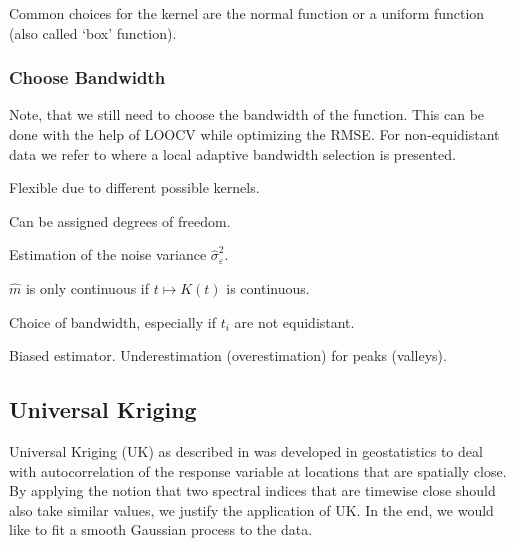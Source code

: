 		Common choices for the kernel are the normal function or a uniform function (also called `box' function). 
		\subsubsection*{Choose Bandwidth}
		Note, that we still need to choose the bandwidth of the function. This can be done with the help of LOOCV while optimizing the RMSE. For non-equidistant data we refer to \cite{brockmannLocallyAdaptiveBandwidth1993} where a local adaptive bandwidth selection is presented.

		\begin{my_pros_cons_table}{
				\item Flexible due to different possible kernels.
				\item Can be assigned degrees of freedom.
				\item Estimation of the noise variance $\hat \sigma_\varepsilon^2$.\footnotemark
			}{
				\item $\hat m $ is only continuous if $t \mapsto K(t)$ is continuous.
				\item Choice of bandwidth, especially if $t_i$ are not equidistant.
				\item Biased estimator. Underestimation (overestimation) for peaks (valleys).
			}
		\end{my_pros_cons_table}


	\subsection{Universal Kriging}
		\label{sec:Kriging}

		Universal Kriging (UK) as described in \cite{diggleGaussianModelsGeostatistical2007} was developed in geostatistics to deal with autocorrelation of the response variable at locations that are spatially close. By applying the notion that two spectral indices that are timewise close should also take similar values, we justify the application of UK. In the end, we would like to fit a smooth Gaussian process to the data.

